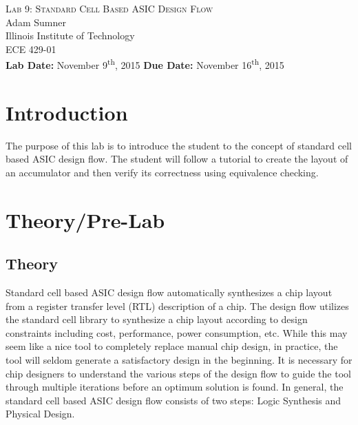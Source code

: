 \documentclass[12pt]{article}
\begin{document}
\begin{titlepage}
	\begin{center}
		
		
		\vfill
		
		\textsc{\LARGE Lab 9: Standard Cell Based ASIC Design Flow}\\[1.5cm]
		
		\Large Adam Sumner\\[0.5cm]
		
		\Large Illinois Institute of Technology\\[0.5cm]
		
		\Large ECE 429-01\\[0.5cm]	
		
		\noindent
		\vfill
		\large \textbf{Lab Date:} November 9\textsuperscript{th}, 2015\hfill
		\large \textbf{Due Date:} November 16\textsuperscript{th}, 2015
	
		
	\end{center}
\end{titlepage}

\section{Introduction}
The purpose of this lab is to introduce the student to the concept of standard cell based ASIC design flow. The student will follow a tutorial to create the layout of an accumulator and then verify its correctness using equivalence checking.
\section{Theory/Pre-Lab}
\subsection{Theory}
Standard cell based ASIC design flow automatically synthesizes a chip layout from a register transfer level (RTL) description of a chip. The design flow utilizes the standard cell library to synthesize a chip layout according to design constraints including cost, performance, power consumption, etc. While this may seem like a nice tool to completely replace manual chip design, in practice, the tool will seldom generate a satisfactory design in the beginning. It is necessary for chip designers to understand the various steps of the design flow to guide the tool through multiple iterations before an optimum solution is found. In general, the standard cell based ASIC design flow consists of two steps: Logic Synthesis and Physical Design.
\end{document}

